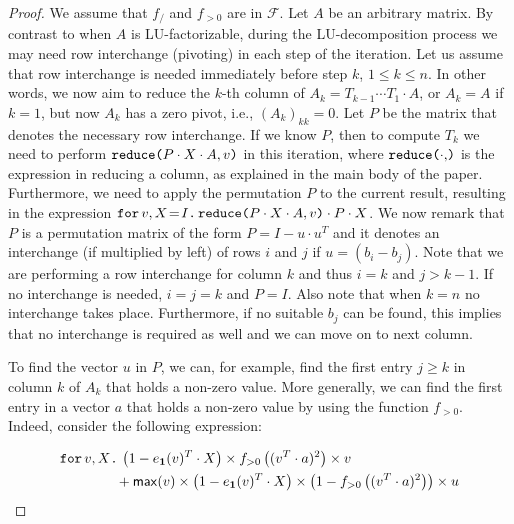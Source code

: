 \begin{proof}

    We assume that $f_{/}$ and $f_{>0}$ are in $\mathcal{F}$. Let $A$ be an arbitrary matrix.
    By contrast to when $A$ is LU-factorizable, during the LU-decomposition process we may need row interchange (pivoting) in each step of the iteration. Let us assume that row interchange is needed immediately before 
    step $k$, $1\leq k\leq n$. In other words, we now aim to reduce the $k$-th column of $A_k=T_{k-1}\cdots T_1\cdot A$, 
    or $A_k=A$ if $k=1$, but now $A_k$ has a zero pivot, i.e., $(A_{k})_{kk}=0$. 
    Let $P$ be the matrix that denotes the necessary row interchange. If we know
    $P$, then 
    to compute $T_k$ we need to perform $\red{P\cdot X\cdot A}{v}$ in this iteration,
    where $\red{\cdot}$ is the expression in \langfor reducing a column, as explained in the main body of the paper.
    Furthermore, we need to apply the permutation $P$ to the current result, resulting in the 
    expression $\initf{I}{v}{X}{\red{P\cdot X\cdot A}{v}\cdot P\cdot X}$. We now remark that
    $P$ is a permutation matrix of the  form $P = I - u\cdot u^T$ and it denotes an interchange (if multiplied by left) of rows $i$ and $j$ if $u=(b_{i}-b_{j})$. Note that we are performing a row interchange for column $k$ and thus $i=k$ and $j>k-1$. If no interchange is needed, $i=j=k$ and $P=I$.
    Also note that when $k=n$ no interchange takes place. Furthermore, if no suitable $b_j$ can
    be found, this implies that no interchange is required as well and we can move on to next column.

    To find the vector $u$ in $P$, we can, for example, find the first entry $j\geq k$ in column $k$ of $A_k$ that holds a non-zero value. More generally, we can find the first entry in a vector $a$ that holds a non-zero value by using the function $f_{>0}$. Indeed, consider the following expression:

    \begin{align*}
        &\texttt{for}\, v,X \texttt{.}\, \left( 1-e_{\ones}(v)^T\cdot X \right) \times f_{>0}\left( ( v^T\cdot a )^2 \right)\times v \\
        &\hspace{4em}+ \mathsf{max}(v)\times\left( 1-e_{\ones}(v)^T\cdot X \right)\times \left( 1 - f_{>0}\left( ( v^T\cdot a )^2 \right) \right) \times u \\
    \end{align*}


\end{proof}
